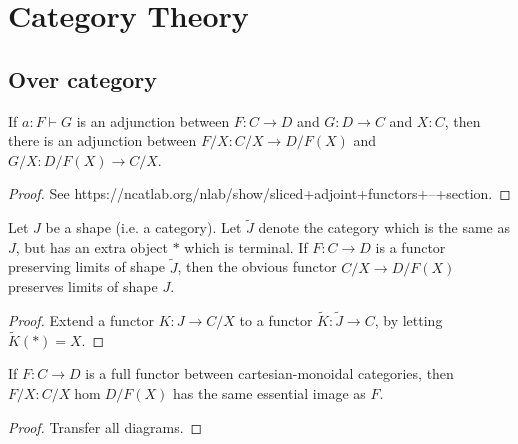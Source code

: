 \section{Category Theory}


\subsection{Over category}


\begin{proposition}
  \label{0-slice-adj}
  \uses{}
  \leanok
  \mathlibok

  If $a : F \vdash G$ is an adjunction between $F : C \to D$ and $G : D \to C$ and $X : C$, then there is an adjunction between $F / X : C / X \to D / F(X)$ and $G / X : D / F(X) \to C / X$.
\end{proposition}
\begin{proof}
  \uses{}
  \leanok

  See https://ncatlab.org/nlab/show/sliced+adjoint+functors+--+section.
\end{proof}


\begin{proposition}
  \label{0-over-lim}
  \uses{}
  \leanok

  Let $J$ be a shape (i.e. a category). Let $\widetilde J$ denote the category which is the same as $J$, but has an extra object $*$ which is terminal.
  If $F : C \to D$ is a functor preserving limits of shape $\widetilde J$, then the obvious functor $C / X \to D / F(X)$ preserves limits of shape $J$.
\end{proposition}
\begin{proof}
  \uses{}
  \leanok

  Extend a functor $K\colon  J \to C / X$ to a functor $\widetilde K\colon \widetilde J \to C$, by letting $\widetilde K (*) = X$.
\end{proof}


\begin{proposition}
  \label{0-ess-image-over}
  \uses{}
  \leanok

  If $F : C \to D$ is a full functor between cartesian-monoidal categories, then $F / X : C / X \hom D / F(X)$ has the same essential image as $F$.
\end{proposition}
\begin{proof}
  \uses{}
  \leanok

  Transfer all diagrams.
\end{proof}


